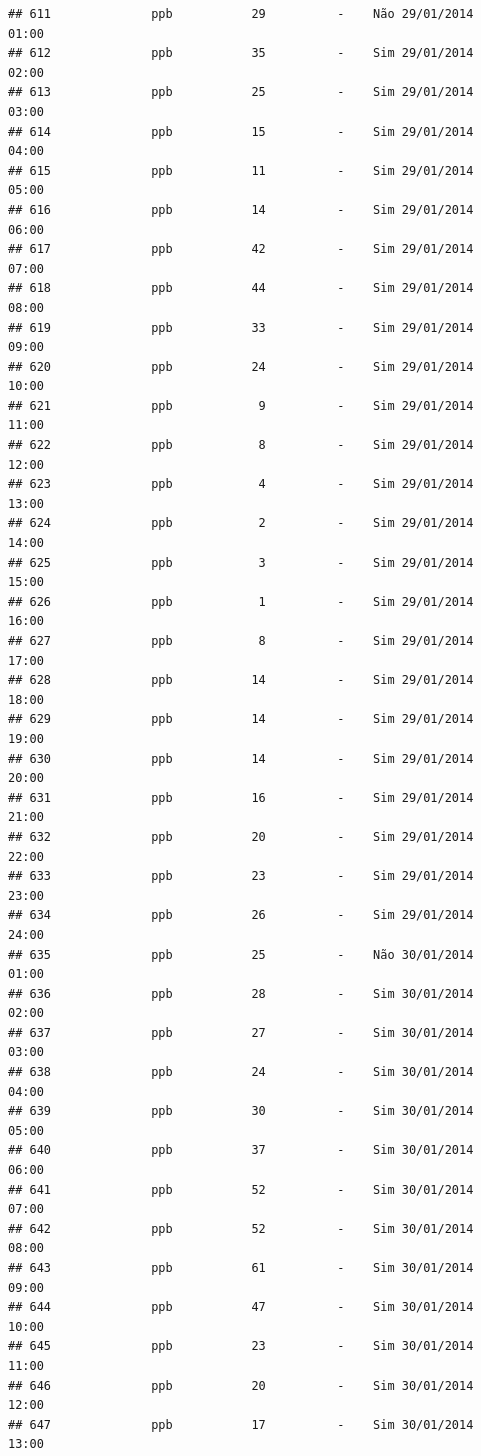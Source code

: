 \documentclass[]{book}
\begin{document}
\begin{verbatim}
## 611              ppb           29          -    Não 29/01/2014 01:00
## 612              ppb           35          -    Sim 29/01/2014 02:00
## 613              ppb           25          -    Sim 29/01/2014 03:00
## 614              ppb           15          -    Sim 29/01/2014 04:00
## 615              ppb           11          -    Sim 29/01/2014 05:00
## 616              ppb           14          -    Sim 29/01/2014 06:00
## 617              ppb           42          -    Sim 29/01/2014 07:00
## 618              ppb           44          -    Sim 29/01/2014 08:00
## 619              ppb           33          -    Sim 29/01/2014 09:00
## 620              ppb           24          -    Sim 29/01/2014 10:00
## 621              ppb            9          -    Sim 29/01/2014 11:00
## 622              ppb            8          -    Sim 29/01/2014 12:00
## 623              ppb            4          -    Sim 29/01/2014 13:00
## 624              ppb            2          -    Sim 29/01/2014 14:00
## 625              ppb            3          -    Sim 29/01/2014 15:00
## 626              ppb            1          -    Sim 29/01/2014 16:00
## 627              ppb            8          -    Sim 29/01/2014 17:00
## 628              ppb           14          -    Sim 29/01/2014 18:00
## 629              ppb           14          -    Sim 29/01/2014 19:00
## 630              ppb           14          -    Sim 29/01/2014 20:00
## 631              ppb           16          -    Sim 29/01/2014 21:00
## 632              ppb           20          -    Sim 29/01/2014 22:00
## 633              ppb           23          -    Sim 29/01/2014 23:00
## 634              ppb           26          -    Sim 29/01/2014 24:00
## 635              ppb           25          -    Não 30/01/2014 01:00
## 636              ppb           28          -    Sim 30/01/2014 02:00
## 637              ppb           27          -    Sim 30/01/2014 03:00
## 638              ppb           24          -    Sim 30/01/2014 04:00
## 639              ppb           30          -    Sim 30/01/2014 05:00
## 640              ppb           37          -    Sim 30/01/2014 06:00
## 641              ppb           52          -    Sim 30/01/2014 07:00
## 642              ppb           52          -    Sim 30/01/2014 08:00
## 643              ppb           61          -    Sim 30/01/2014 09:00
## 644              ppb           47          -    Sim 30/01/2014 10:00
## 645              ppb           23          -    Sim 30/01/2014 11:00
## 646              ppb           20          -    Sim 30/01/2014 12:00
## 647              ppb           17          -    Sim 30/01/2014 13:00

\end{verbatim}
\end{document}
